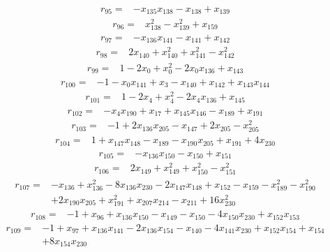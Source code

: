 \[\begin{aligned}
r_{95}={}&-x_{135}x_{138}-x_{138}+x_{139}
\end{aligned}\]
\[\begin{aligned}
r_{96}={}&x_{138}^{2}-x_{139}^{2}+x_{159}
\end{aligned}\]
\[\begin{aligned}
r_{97}={}&-x_{136}x_{141}-x_{141}+x_{142}
\end{aligned}\]
\[\begin{aligned}
r_{98}={}&2x_{140}+x_{140}^{2}+x_{141}^{2}-x_{142}^{2}
\end{aligned}\]
\[\begin{aligned}
r_{99}={}&1-2x_{0}+x_{0}^{2}-2x_{0}x_{136}+x_{143}
\end{aligned}\]
\[\begin{aligned}
r_{100}={}&-1-x_{0}x_{141}+x_{3}-x_{140}+x_{142}+x_{143}x_{144}
\end{aligned}\]
\[\begin{aligned}
r_{101}={}&1-2x_{4}+x_{4}^{2}-2x_{4}x_{136}+x_{145}
\end{aligned}\]
\[\begin{aligned}
r_{102}={}&-x_{4}x_{190}+x_{17}+x_{145}x_{146}-x_{189}+x_{191}
\end{aligned}\]
\[\begin{aligned}
r_{103}={}&-1+2x_{136}x_{205}-x_{147}+2x_{205}-x_{205}^{2}
\end{aligned}\]
\[\begin{aligned}
r_{104}={}&1+x_{147}x_{148}-x_{189}-x_{190}x_{205}+x_{191}+4x_{230}
\end{aligned}\]
\[\begin{aligned}
r_{105}={}&-x_{136}x_{150}-x_{150}+x_{151}
\end{aligned}\]
\[\begin{aligned}
r_{106}={}&2x_{149}+x_{149}^{2}+x_{150}^{2}-x_{151}^{2}
\end{aligned}\]
\[\begin{aligned}
r_{107}={}&-x_{136}+x_{136}^{2}-8x_{136}x_{230}-2x_{147}x_{148}+x_{152}-x_{159}-x_{189}^{2}-x_{190}^{2}
\\ &+2x_{190}x_{205}+x_{191}^{2}+x_{207}x_{214}-x_{211}+16x_{230}^{2}
\end{aligned}\]
\[\begin{aligned}
r_{108}={}&-1+x_{96}+x_{136}x_{150}-x_{149}-x_{150}-4x_{150}x_{230}+x_{152}x_{153}
\end{aligned}\]
\[\begin{aligned}
r_{109}={}&-1+x_{97}+x_{136}x_{141}-2x_{136}x_{154}-x_{140}-4x_{141}x_{230}+x_{152}x_{154}+x_{154}
\\ &+8x_{154}x_{230}
\end{aligned}\]
